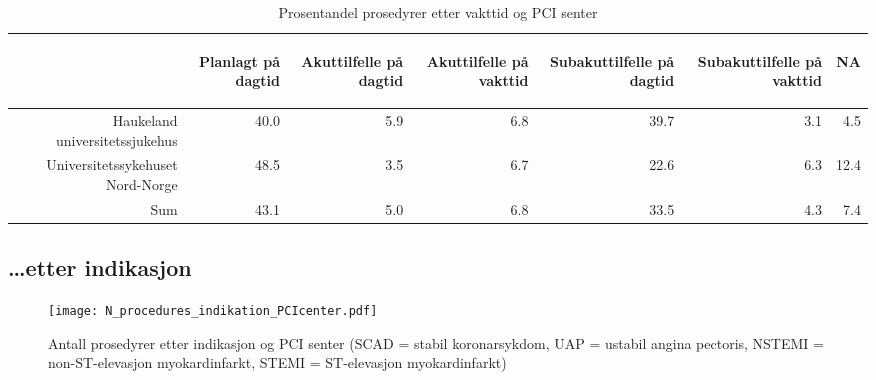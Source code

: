 \documentclass[norsk, a4paper]{report}
\begin{document}
\begin{tiny}
\begin{table}[ht]
\centering
\begin{tabular}{rrrrrrr}
  \toprule
 & \begin{sideways} Planlagt på dagtid \end{sideways} & \begin{sideways} Akuttilfelle på dagtid \end{sideways} & \begin{sideways} Akuttilfelle på vakttid \end{sideways} & \begin{sideways} Subakuttilfelle på dagtid \end{sideways} & \begin{sideways} Subakuttilfelle på vakttid \end{sideways} & \begin{sideways} NA \end{sideways} \\ 
  \midrule
Haukeland universitetssjukehus & 40.0 & 5.9 & 6.8 & 39.7 & 3.1 & 4.5 \\ 
  Universitetssykehuset Nord-Norge & 48.5 & 3.5 & 6.7 & 22.6 & 6.3 & 12.4 \\ 
  Sum & 43.1 & 5.0 & 6.8 & 33.5 & 4.3 & 7.4 \\ 
   \bottomrule
\end{tabular}
\caption{Prosentandel prosedyrer etter vakttid og PCI senter} 
\end{table}\end{tiny}



\clearpage
\subsection{\ldots etter indikasjon}


\begin{figure}[ht]
  \centering
\texttt{[image: N\_procedures\_indikation\_PCIcenter.pdf]}  \caption{Antall prosedyrer etter indikasjon og PCI senter (SCAD = stabil koronarsykdom, UAP = ustabil angina pectoris, NSTEMI = non-ST-elevasjon myokardinfarkt, STEMI = ST-elevasjon myokardinfarkt)}
\end{figure}
\end{document}
